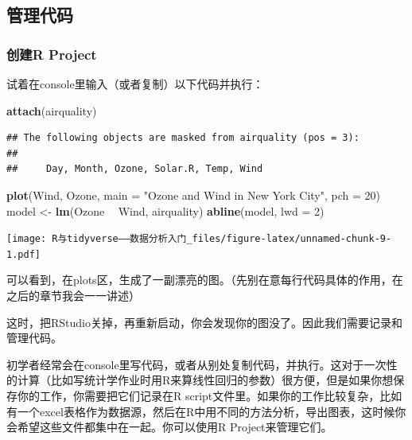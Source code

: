 \documentclass[]{book}
\newenvironment{Shaded}{\begin{snugshade}}{\end{snugshade}}
\newcommand{\DataTypeTok}[1]{\textcolor[rgb]{0.13,0.29,0.53}{#1}}
\newcommand{\DecValTok}[1]{\textcolor[rgb]{0.00,0.00,0.81}{#1}}
\newcommand{\KeywordTok}[1]{\textcolor[rgb]{0.13,0.29,0.53}{\textbf{#1}}}
\newcommand{\NormalTok}[1]{#1}
\newcommand{\OperatorTok}[1]{\textcolor[rgb]{0.81,0.36,0.00}{\textbf{#1}}}
\newcommand{\StringTok}[1]{\textcolor[rgb]{0.31,0.60,0.02}{#1}}
\begin{document}
\hypertarget{code-management}{%
\subsection{管理代码}\label{code-management}}

\hypertarget{project-create}{%
\subsubsection{创建R Project}\label{project-create}}

试着在console里输入（或者复制）以下代码并执行：

\begin{Shaded}
\begin{Highlighting}[]
\KeywordTok{attach}\NormalTok{(airquality)}
\end{Highlighting}
\end{Shaded}

\begin{verbatim}
## The following objects are masked from airquality (pos = 3):
## 
##     Day, Month, Ozone, Solar.R, Temp, Wind
\end{verbatim}

\begin{Shaded}
\begin{Highlighting}[]
\KeywordTok{plot}\NormalTok{(Wind, Ozone, }\DataTypeTok{main =} \StringTok{"Ozone and Wind in New York City"}\NormalTok{, }\DataTypeTok{pch =} \DecValTok{20}\NormalTok{)}
\NormalTok{model <-}\StringTok{ }\KeywordTok{lm}\NormalTok{(Ozone }\OperatorTok{~}\StringTok{ }\NormalTok{Wind, airquality)}
\KeywordTok{abline}\NormalTok{(model, }\DataTypeTok{lwd =} \DecValTok{2}\NormalTok{)}
\end{Highlighting}
\end{Shaded}

\texttt{[image: R与tidyverse——数据分析入门\_files/figure-latex/unnamed-chunk-9-1.pdf]}

可以看到，在plots区，生成了一副漂亮的图。（先别在意每行代码具体的作用，在之后的章节我会一一讲述）

这时，把RStudio关掉，再重新启动，你会发现你的图没了。因此我们需要记录和管理代码。

初学者经常会在console里写代码，或者从别处复制代码，并执行。这对于一次性的计算（比如写统计学作业时用R来算线性回归的参数）很方便，但是如果你想保存你的工作，你需要把它们记录在R script文件里。如果你的工作比较复杂，比如有一个excel表格作为数据源，然后在R中用不同的方法分析，导出图表，这时候你会希望这些文件都集中在一起。你可以使用R Project来管理它们。
\end{document}

